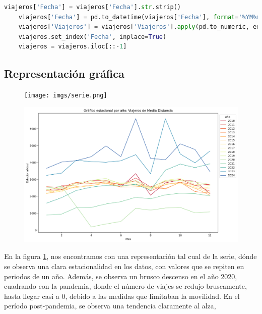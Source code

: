 \documentclass[a4paper,onecolumn]{extarticle}
\begin{document}
\begin{sloppypar}
\begin{lstlisting}[language=Python]
    viajeros['Fecha'] = viajeros['Fecha'].str.strip()
    viajeros['Fecha'] = pd.to_datetime(viajeros['Fecha'], format='%YM%m')
    viajeros['Viajeros'] = viajeros['Viajeros'].apply(pd.to_numeric, errors='coerce')
    viajeros.set_index('Fecha', inplace=True)
    viajeros = viajeros.iloc[::-1]
\end{lstlisting}

\subsection{Representación gráfica}
\begin{center}
    \begin{figure}[h!]
        \centering
        \texttt{[image: imgs/serie.png]}
        \caption{} \label{fig:serie}
    \end{figure}
\end{center}
\begin{center}
    \begin{figure}[h!]
        \centering
        \includegraphics[width=\textwidth]{imgs/seriePorAño.png}
        \caption{} \label{fig:seriePorAño}
    \end{figure}
\end{center}
En la figura \ref{fig:serie}, nos encontramos con una representación tal cual de la serie, dónde se observa una clara estacionalidad en los datos, con valores 
que se repiten en periodos de un año. Además, se observa un brusco descenso en el año 2020, cuadrando con la pandemia, donde el número de viajes se redujo 
bruscamente, hasta llegar casi a 0, debido a las medidas que limitaban la movilidad. En el período post-pandemia, se observa una tendencia claramente al alza, 

\end{sloppypar}
\end{document}
